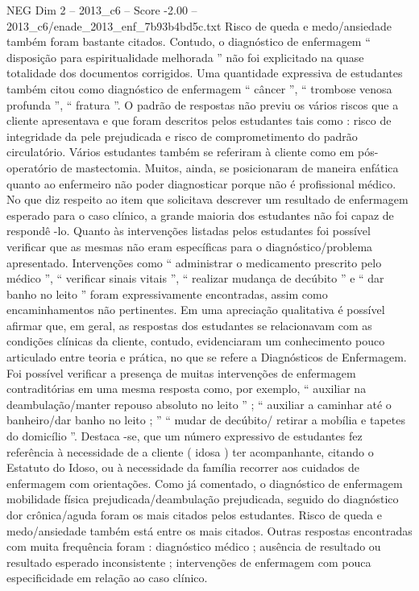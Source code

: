 \begin{textsample}{NEG Dim 2 – 2013\_c6 – Score -2.00 – 2013\_c6/enade\_2013\_enf\_7b93b4bd5c.txt}
Risco de queda e medo/ansiedade também foram bastante citados.
Contudo, o diagnóstico de enfermagem “ disposição para espiritualidade melhorada ” não foi explicitado na quase totalidade dos documentos corrigidos.
Uma quantidade expressiva de estudantes também citou como diagnóstico de enfermagem “ câncer ”, “ trombose venosa profunda ”, “ fratura ”.
O padrão de respostas não previu os vários riscos que a cliente apresentava e que foram descritos pelos estudantes tais como : risco de integridade da pele prejudicada e risco de comprometimento do padrão circulatório.
Vários estudantes também se referiram à cliente como em pós-operatório de mastectomia.
Muitos, ainda, se posicionaram de maneira enfática quanto ao enfermeiro não poder diagnosticar porque não é profissional médico.
No que diz respeito ao item que solicitava descrever um resultado de enfermagem esperado para o caso clínico, a grande maioria dos estudantes não foi capaz de respondê -lo.
Quanto às intervenções listadas pelos estudantes foi possível verificar que as mesmas não eram específicas para o diagnóstico/problema apresentado.
Intervenções como “ administrar o medicamento prescrito pelo médico ”, “ verificar sinais vitais ”, “ realizar mudança de decúbito ” e “ dar banho no leito ” foram expressivamente encontradas, assim como encaminhamentos não pertinentes.
Em uma apreciação qualitativa é possível afirmar que, em geral, as respostas dos estudantes se relacionavam com as condições clínicas da cliente, contudo, evidenciaram um conhecimento pouco articulado entre teoria e prática, no que se refere a Diagnósticos de Enfermagem.
Foi possível verificar a presença de muitas intervenções de enfermagem contraditórias em uma mesma resposta como, por exemplo, “ auxiliar na deambulação/manter repouso absoluto no leito ” ; “ auxiliar a caminhar até o banheiro/dar banho no leito ; ” “ mudar de decúbito/ retirar a mobília e tapetes do domicílio ”.
Destaca -se, que um número expressivo de estudantes fez referência à necessidade de a cliente ( idosa ) ter acompanhante, citando o Estatuto do Idoso, ou à necessidade da família recorrer aos cuidados de enfermagem com orientações.
Como já comentado, o diagnóstico de enfermagem mobilidade física prejudicada/deambulação prejudicada, seguido do diagnóstico dor crônica/aguda foram os mais citados pelos estudantes.
Risco de queda e medo/ansiedade também está entre os mais citados.
Outras respostas encontradas com muita frequência foram : diagnóstico médico ; ausência de resultado ou resultado esperado inconsistente ; intervenções de enfermagem com pouca especificidade em relação ao caso clínico.

\end{textsample}
